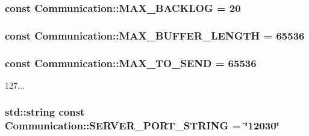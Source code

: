 \subsubsection[{M\+A\+X\+\_\+\+B\+A\+C\+K\+L\+O\+G}]{ const Communication\+::\+M\+A\+X\+\_\+\+B\+A\+C\+K\+L\+O\+G = 20}\label{namespace_communication_aeb78e3ef9fb26a4967e9dc221207d598}
\hypertarget{namespace_communication_a369209f66df3d0e47bb8982dd0f320dd}{}
\subsubsection[{M\+A\+X\+\_\+\+B\+U\+F\+F\+E\+R\+\_\+\+L\+E\+N\+G\+T\+H}]{ const Communication\+::\+M\+A\+X\+\_\+\+B\+U\+F\+F\+E\+R\+\_\+\+L\+E\+N\+G\+T\+H = 65536}\label{namespace_communication_a369209f66df3d0e47bb8982dd0f320dd}
\hypertarget{namespace_communication_a74040d78a5662f3bfdf04a041b92c705}{}
\subsubsection[{M\+A\+X\+\_\+\+T\+O\+\_\+\+S\+E\+N\+D}]{ const Communication\+::\+M\+A\+X\+\_\+\+T\+O\+\_\+\+S\+E\+N\+D = 65536}\label{namespace_communication_a74040d78a5662f3bfdf04a041b92c705}


127... 

\hypertarget{namespace_communication_a884c249a47d85e8847b1b147b5e66ada}{}
\subsubsection[{S\+E\+R\+V\+E\+R\+\_\+\+P\+O\+R\+T\+\_\+\+S\+T\+R\+I\+N\+G}]{\setlength{\rightskip}{0pt plus 5cm}std\+::string const Communication\+::\+S\+E\+R\+V\+E\+R\+\_\+\+P\+O\+R\+T\+\_\+\+S\+T\+R\+I\+N\+G = \char`\"{}12030\char`\"{}}\label{namespace_communication_a884c249a47d85e8847b1b147b5e66ada}
